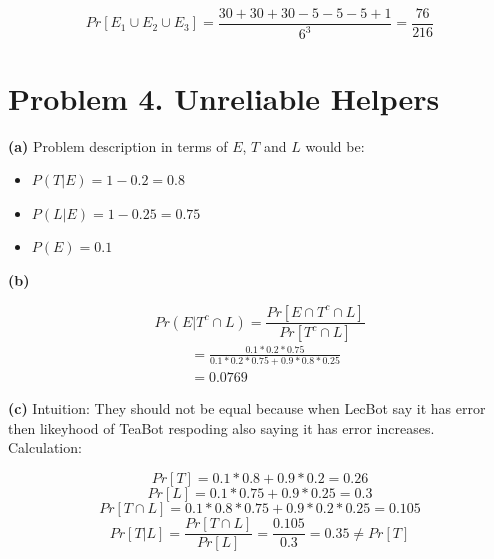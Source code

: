 \documentclass{article}
\begin{document}
\[Pr[E_1 \cup E_2 \cup E_3] = \frac{30 + 30 + 30 - 5 - 5 - 5 + 1}{6^3} = \frac{76}{216}\]

\section*{Problem 4. Unreliable Helpers}
\textbf{(a)}
Problem description in terms of $E$, $T$ and $L$ would be:
\begin{itemize}
\item $P(T|E) = 1 - 0.2 = 0.8$
\item $P(L|E) = 1 - 0.25 = 0.75$
\item $P(E) = 0.1$
\end{itemize}

\vspace{\baselineskip}
\noindent\textbf{(b)}

\[Pr(E|T^c \cap L) = \frac{Pr[E \cap T^c \cap L]}{Pr[T^c \cap L]}\]
\[
\begin{aligned}
&= \frac{0.1 * 0.2 * 0.75}{0.1 * 0.2 * 0.75 + 0.9 * 0.8 * 0.25}\\
& = 0.0769
\end{aligned}
\]

\vspace{\baselineskip}
\noindent\textbf{(c)}
Intuition: They should not be equal because when LecBot say it has error then likeyhood of TeaBot respoding also saying it has error increases.
Calculation:

\[Pr[T] = 0.1 * 0.8 + 0.9 * 0.2 = 0.26\]
\[Pr[L] = 0.1 * 0.75 + 0.9 * 0.25 = 0.3\]
\[Pr[T \cap L] = 0.1 * 0.8 * 0.75 + 0.9 * 0.2 * 0.25 = 0.105 \]
\[Pr[T|L] = \frac{Pr[T \cap L]}{Pr[L]} = \frac{0.105}{0.3} = 0.35 \neq Pr[T]\]
\end{document}
